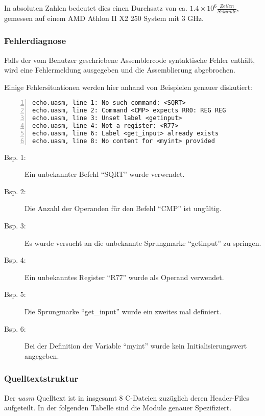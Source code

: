 In absoluten Zahlen bedeutet dies einen Durchsatz von ca.
$1.4 \times 10^6 \frac{Zeilen}{Sekunde}$, gemessen auf einem
AMD Athlon II X2 250 System mit 3 GHz.

\subsubsection{Fehlerdiagnose}

Falls der vom Benutzer geschriebene Assemblercode syntaktische Fehler enthält,
wird eine Fehlermeldung ausgegeben und die Assemblierung abgebrochen.

Einige Fehlersituationen werden hier anhand von Beispielen genauer diskutiert:
\begin{lstlisting}[numbers=left, numberstyle=\tiny]
echo.uasm, line 1: No such command: <SQRT>
echo.uasm, line 2: Command <CMP> expects RR0: REG REG
echo.uasm, line 3: Unset label <getinput>
echo.uasm, line 4: Not a register: <R77>
echo.uasm, line 6: Label <get_input> already exists
echo.uasm, line 8: No content for <myint> provided
\end{lstlisting}

\begin{description}
    \item[Bsp. 1:] Ein unbekannter Befehl ``SQRT'' wurde verwendet.
    \item[Bsp. 2:] Die Anzahl der Operanden für den Befehl ``CMP'' ist ungültig.
    \item[Bsp. 3:] Es wurde versucht an die unbekannte Sprungmarke ``getinput''
                   zu springen.
    \item[Bsp. 4:] Ein unbekanntes Register ``R77'' wurde als Operand verwendet.
    \item[Bsp. 5:] Die Sprungmarke ``get\_input'' wurde ein zweites mal
                   definiert.
    \item[Bsp. 6:] Bei der Definition der Variable ``myint'' wurde kein
                   Initialisierungswert angegeben.
\end{description}

\subsubsection{Quelltextstruktur}

Der \emph{uasm} Quelltext ist in insgesamt 8 C-Dateien zuzüglich deren
Header-Files aufgeteilt. In der folgenden Tabelle sind die Module genauer
Spezifiziert.

